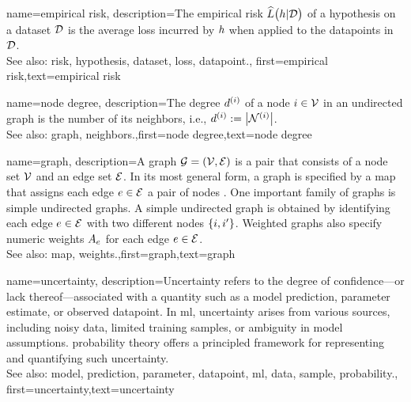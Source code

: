 {name={empirical risk},
  description={The empirical \gls{risk} $\widehat{L}\big(h|\mathcal{D}\big)$ 
  	of a \gls{hypothesis} on a \gls{dataset} $\mathcal{D}$ is the average \gls{loss} incurred 
  	by $h$ when applied to the \glspl{datapoint} in $\mathcal{D}$.
				\\ 
		See also: \gls{risk}, \gls{hypothesis}, \gls{dataset}, \gls{loss}, \gls{datapoint}.},
  first={empirical risk},text={empirical risk} 
}

{name={node degree},
	description={The degree $d^{(i)}$ of a node $i \in \mathcal{V}$ 
		in an undirected \gls{graph} is the number of its \gls{neighbors}, i.e., $d^{(i)} := \big|\mathcal{N}^{(i)}\big|$.
					\\ 
		See also: \gls{graph}, \gls{neighbors}.},first={node degree},text={node degree} 
}

{name={graph},
	description={A graph $\mathcal{G} = \left( \mathcal{V},\mathcal{E} \right)$ is a pair that consists of 
		a node set $\mathcal{V}$ and an edge set $\mathcal{E}$. In its most general form, a graph is 
		specified by a \gls{map} that assigns each edge $e \in \mathcal{E}$ a pair of nodes \cite{RockNetworks}. 
		One important family of graphs is simple undirected graphs. A simple undirected graph 
		is obtained by identifying each edge $e \in \mathcal{E}$ with two different nodes $\{i,i'\}$. 
		Weighted graphs also specify numeric \gls{weights} $A_{e}$ for each 
		edge $e \in \mathcal{E}$.
					\\ 
		See also: \gls{map}, \gls{weights}.},first={graph},text={graph} 
}

{name={uncertainty},
	description={Uncertainty refers to the degree of confidence—or 
		lack thereof—associated with a quantity such as a \gls{model} \gls{prediction}, \gls{parameter} estimate, or 
		observed \gls{datapoint}. In \gls{ml}, uncertainty arises from various sources, including 
		noisy \gls{data}, limited training \glspl{sample}, or ambiguity in \gls{model} assumptions. \Gls{probability} theory 
		offers a principled framework for representing and quantifying such uncertainty.
					\\ 
		See also: \gls{model}, \gls{prediction}, \gls{parameter}, \gls{datapoint}, \gls{ml}, \gls{data}, \gls{sample}, \gls{probability}.},
	first={uncertainty},text={uncertainty}
}

